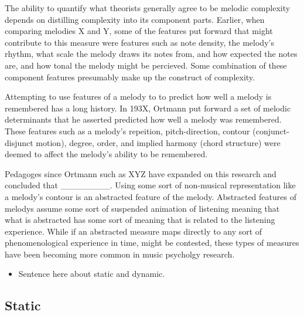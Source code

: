 \documentclass[]{book}
\providecommand{\tightlist}{%
  \setlength{\itemsep}{0pt}\setlength{\parskip}{0pt}}
\begin{document}
The ability to quantify what theorists generally agree to be melodic complexity depends on distilling complexity into its component parts.
Earlier, when comparing melodies X and Y, some of the features put forward that might contribute to this measure were features such as note density, the melody's rhythm, what scale the melody draws its notes from, and how expected the notes are, and how tonal the melody might be percieved.
Some combination of these component features presumably make up the construct of complexity.

Attempting to use features of a melody to to predict how well a melody is remembered has a long history.
In 193X, Ortmann put forward a set of melodic determinants that he asserted predicted how well a melody was remembered.
These features such as a melody's repeition, pitch-direction, contour (conjunct-disjunct motion), degree, order, and implied harmony (chord structure) were deemed to affect the melody's ability to be remembered.

Pedagoges since Ortmann such as XYZ have expanded on this research and concluded that \_\_\_\_\_\_\_\_.
Using some sort of non-musical representation like a melody's contour is an abstracted feature of the melody.
Abstracted features of melodys assume some sort of suspended animation of listening meaning that what is abstracted has some sort of meaning that is related to the listening experience.
While if an abstracted measure maps directly to any sort of phenomenological experience in time, might be contested, these types of measures have been becoming more common in music psycholgy research.

\begin{itemize}
\tightlist
\item
  Sentence here about static and dynamic.
\end{itemize}

\hypertarget{static}{%
\subsection{Static}\label{static}}
\end{document}

